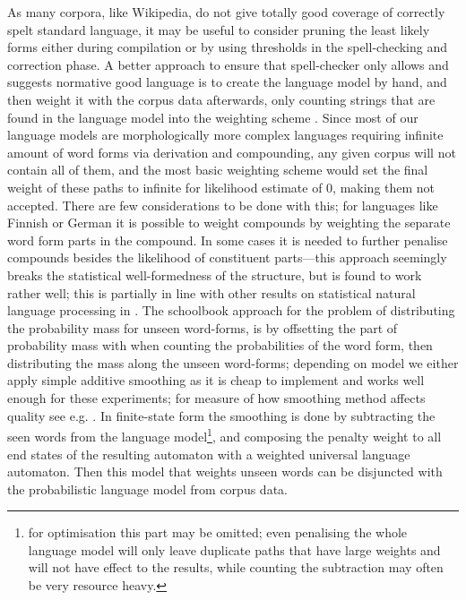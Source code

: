 \documentclass[a4paper,12pt]{article}
\begin{document}
As many corpora, like Wikipedia, do not give totally good coverage of correctly
spelt standard language, it may be useful to consider pruning the least likely
forms either during compilation or by using thresholds in the spell-checking
and correction phase. A better approach to ensure that spell-checker only
allows and suggests normative good language is to create the language model by
hand, and then weight it with the corpus data afterwards, only counting strings
that are found in the language model into the weighting scheme
\cite[]{pirinen/2009/nodalida}. Since most of our language models are
morphologically more complex languages requiring infinite amount of word forms
via derivation and compounding, any given corpus will not contain all of them,
and the most basic weighting scheme would set the final weight of these paths
to infinite for likelihood estimate of 0, making them not accepted. There are
few considerations to be done with this; for languages like Finnish or German
\cite[]{schiller2006german} it is possible to weight compounds by weighting the
separate word form parts in the compound. In some cases it is needed to further
penalise compounds besides the likelihood of constituent parts---this approach
seemingly breaks the statistical well-formedness of the structure, but is found
to work rather well; this is partially in line with other results on
statistical natural language processing in \cite{brants2007large}. The
schoolbook approach for the problem of distributing the probability mass for
unseen word-forms, is by offsetting the part of probability mass with when
counting the probabilities of the word form, then distributing the mass along
the unseen word-forms\cite[for a good introduction to smoothing models we refer
to][]{jurafsky2000speech}; depending on model we either apply simple additive
smoothing as it is cheap to implement and works well enough for these
experiments; for measure of how smoothing method affects quality see e.g.
\cite{chen1999empirical}. In finite-state form the smoothing is done by
subtracting the seen words from the language model\footnote{for optimisation
    this part may be omitted; even penalising the whole language model will
    only leave duplicate paths that have large weights and will not have effect
    to the results, while counting the subtraction may often be very resource
heavy.}, and composing the penalty weight to all end states of the resulting
automaton with a weighted universal language automaton. Then this model that
weights unseen words can be disjuncted with the probabilistic language model
from corpus data.
\end{document}
